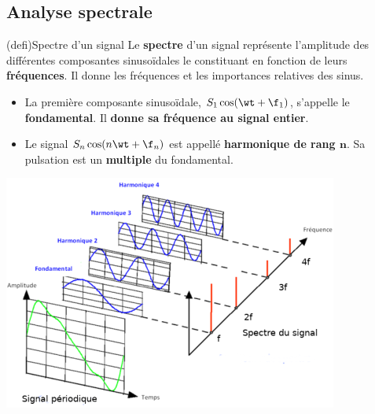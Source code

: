 \documentclass[../../main/main.tex]{subfiles}
\begin{document}
\vspace{-15pt}
\subsection{Analyse spectrale}

\begin{tcb}[sidebyside, righthand ratio=.4](defi){Spectre d'un signal}
	Le \textbf{spectre} d'un signal représente l'amplitude des différentes
	composantes sinusoïdales le constituant en fonction de leurs
	\textbf{fréquences}. Il donne les fréquences et les importances relatives des
	sinus.
	\begin{itemize}
		\item La première composante sinusoïdale, $S_1 \cos(\wt + \f_1)$,
		      s'appelle le \textbf{fondamental}. Il \textbf{donne sa fréquence au
			      signal entier}.
		\item Le signal $S_n \cos(n\wt + \f_n)$ est appellé
		      \textbf{harmonique de rang $\mathbf{n}$}. Sa pulsation est un
		      \textbf{multiple} du fondamental.
	\end{itemize}
	\tcblower
	\begin{center}
		\includegraphics[width=\linewidth]{decompo_fourier}
		\label{fig:fourier}
	\end{center}
\end{tcb}
\end{document}
